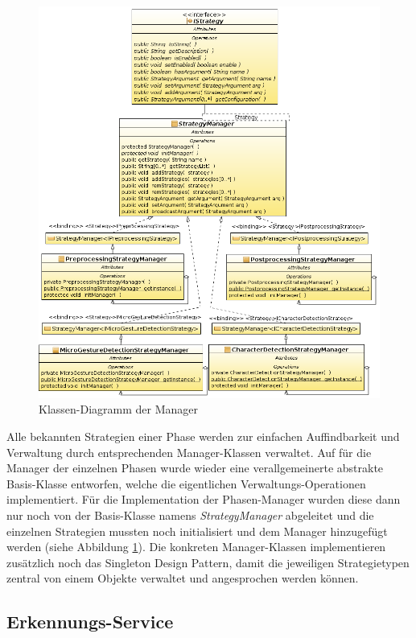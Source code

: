 \begin{figure}[h!]
   \centering
   \includegraphics[width=\textwidth]{img/uml_cd_manager} 
   \caption{Klassen-Diagramm der Manager}
   \label{fig:cd_manager}
\end{figure}

Alle bekannten Strategien einer Phase werden zur einfachen Auffindbarkeit und Verwaltung durch entsprechenden Manager-Klassen verwaltet. Auf für die Manager der einzelnen Phasen wurde wieder eine verallgemeinerte abstrakte Basis-Klasse entworfen, welche die eigentlichen Verwaltungs-Operationen implementiert. Für die Implementation der Phasen-Manager wurden diese dann nur noch von der Basis-Klasse namens \emph{StrategyManager} abgeleitet und die einzelnen Strategien mussten noch initialisiert und dem Manager hinzugefügt werden (siehe Abbildung \ref{fig:cd_manager}). Die konkreten Manager-Klassen implementieren zusätzlich noch das Singleton Design Pattern\cite[S.127-134]{designpatterns}, damit die jeweiligen Strategietypen zentral von einem Objekte verwaltet und angesprochen werden können.

\subsection{Erkennungs-Service}\label{lbl_be_design_service}

